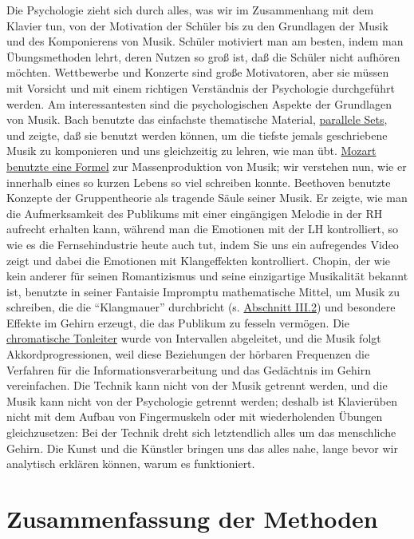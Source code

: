 Die Psychologie zieht sich durch alles, was wir im Zusammenhang mit dem Klavier tun, von der Motivation der Schüler bis zu den Grundlagen der Musik und des Komponierens von Musik.
Schüler motiviert man am besten, indem man Übungsmethoden lehrt, deren Nutzen so groß ist, daß die Schüler nicht aufhören möchten.
Wettbewerbe und Konzerte sind große Motivatoren, aber sie müssen mit Vorsicht und mit einem richtigen Verständnis der Psychologie durchgeführt werden.
Am interessantesten sind die psychologischen Aspekte der Grundlagen von Musik.
Bach benutzte das einfachste thematische Material, \hyperlink{c1iii20ps}{parallele Sets}, und zeigte, daß sie benutzt werden können, um die tiefste jemals geschriebene Musik zu komponieren und uns gleichzeitig zu lehren, wie man übt.
\hyperlink{c1iv4}{Mozart benutzte eine Formel} zur Massenproduktion von Musik;
wir verstehen nun, wie er innerhalb eines so kurzen Lebens so viel schreiben konnte.
Beethoven benutzte Konzepte der Gruppentheorie als tragende Säule seiner Musik.
Er zeigte, wie man die Aufmerksamkeit des Publikums mit einer eingängigen Melodie in der RH aufrecht erhalten kann, während man die Emotionen mit der LH kontrolliert, so wie es die Fernsehindustrie heute auch tut, indem Sie uns ein aufregendes Video zeigt und dabei die Emotionen mit Klangeffekten kontrolliert.
Chopin, der wie kein anderer für seinen Romantizismus und seine einzigartige Musikalität bekannt ist, benutzte in seiner Fantaisie Impromptu mathematische Mittel, um Musik zu schreiben, die die \enquote{Klangmauer} durchbricht (s. \hyperlink{c1iii2}{Abschnitt III.2}) und besondere Effekte im Gehirn erzeugt, die das Publikum zu fesseln vermögen.
Die \hyperlink{c2_2}{chromatische Tonleiter} wurde von Intervallen abgeleitet, und die Musik folgt Akkordprogressionen, weil diese Beziehungen der hörbaren Frequenzen die Verfahren für die Informationsverarbeitung und das Gedächtnis im Gehirn vereinfachen.
Die Technik kann nicht von der Musik getrennt werden, und die Musik kann nicht von der Psychologie getrennt werden; deshalb ist Klavierüben nicht mit dem Aufbau von Fingermuskeln oder mit wiederholenden Übungen gleichzusetzen: Bei der Technik dreht sich letztendlich alles um das menschliche Gehirn.
Die Kunst und die Künstler bringen uns das alles nahe, lange bevor wir analytisch erklären können, warum es funktioniert.


\section{Zusammenfassung der Methoden}\hypertarget{c1iii22}{}

